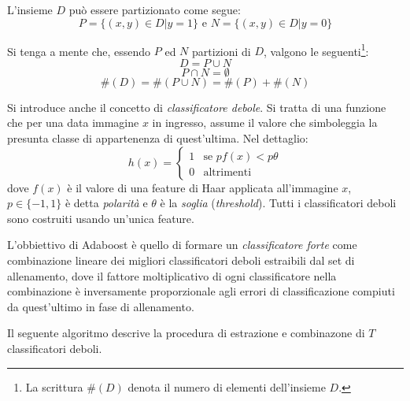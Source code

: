 L'insieme $D$ può essere partizionato come segue:
$$P = \{(x, y) \in D | y = 1\} \text{ e } N = \{(x,y) \in D | y = 0\}$$

Si tenga a mente che, essendo $P$ ed $N$ partizioni di $D$, valgono le seguenti\footnote{La scrittura $\#(D)$ denota il numero di elementi dell'insieme $D$.}:
\begin{equation}
    D = P \cup N
\end{equation}
\begin{equation}
    P \cap N = \emptyset
\end{equation}
\begin{equation}
    \#(D) = \#(P \cup N) = \#(P) + \#(N)
\end{equation}

Si introduce anche il concetto di \emph{classificatore debole}. Si tratta di una funzione che per una data immagine $x$ in ingresso, assume il valore che simboleggia la presunta classe di appartenenza di quest'ultima.
Nel dettaglio:
\begin{equation}
    h(x) = \begin{cases}
    1 & \text{se $pf(x) < p\theta$}\\
    0 & \text{altrimenti}
\end{cases}
\end{equation}
dove $f(x)$ è il valore di una feature di Haar applicata all'immagine $x$, $p \in \{-1,1\}$ è detta \emph{polarità} e $\theta$ è la \emph{soglia} (\emph{threshold}). Tutti i classificatori deboli sono costruiti usando un'unica feature.

L'obbiettivo di Adaboost è quello di formare un \emph{classificatore forte} come combinazione lineare dei migliori classificatori deboli estraibili dal set di allenamento, dove il fattore moltiplicativo di ogni classificatore nella combinazione è inversamente proporzionale agli errori di classificazione compiuti da quest'ultimo in fase di allenamento.

Il seguente algoritmo descrive la procedura di estrazione e combinazone di $T$ classificatori deboli.

